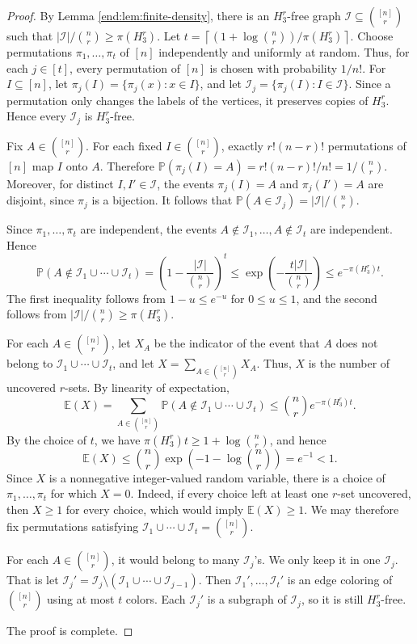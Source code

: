 \documentclass[12pt,a4paper]{article}
\numberwithin{equation}{section}
\theoremstyle{definition}
\theoremstyle{remark}
\begin{document}
\begin{proof}
By Lemma \ref{end:lem:finite-density}, there is an $H_3^r$-free graph  $\mathcal I\subseteq\binom{[n]}r$ such that $|\mathcal I|/\binom nr\ge\pi(H_3^r)$.  Let
$t=\left\lceil(1+\log\binom nr)/\pi(H_3^r)\right\rceil$.
Choose permutations $\pi_1,\ldots,\pi_t$ of $[n]$ independently and uniformly at random.  Thus, for each $j\in[t]$, every permutation of $[n]$ is chosen with probability $1/n!$.  For $I\subseteq[n]$, let $\pi_j(I)=\{\pi_j(x):x\in I\}$, and let $\mathcal I_j=\{\pi_j(I):I\in\mathcal I\}$.  Since a permutation only changes the labels of the vertices, it preserves copies of $H_3^r$.  Hence every $\mathcal I_j$ is $H_3^r$-free.

Fix $A\in\binom{[n]}r$.  For each fixed $I\in\binom{[n]}r$, exactly $r!(n-r)!$ permutations of $[n]$ map $I$ onto $A$. 
Therefore $\mathbb{P}(\pi_j(I)=A)=r!(n-r)!/n!=1/\binom nr$.
Moreover, for distinct $I,I'\in\mathcal I$, the events $\pi_j(I)=A$ and $\pi_j(I')=A$ are disjoint, since $\pi_j$ is a bijection.  
It follows that $\mathbb{P}(A\in\mathcal I_j)=|\mathcal I|/\binom nr$.

Since $\pi_1,\ldots,\pi_t$ are independent, the events $A\notin\mathcal I_1,\ldots,A\notin\mathcal I_t$ are independent.  Hence
$$ \mathbb{P}(A\notin\mathcal I_1\cup\cdots\cup\mathcal I_t)
 =\left(1-\frac{|\mathcal I|}{\binom nr}\right)^t
 \le \exp\left(-\frac{t|\mathcal I|}{\binom nr}\right)
 \le e^{-\pi(H_3^r)t}.$$
The first inequality follows from $1-u\le e^{-u}$ for $0\le u\le1$, and the second follows from $|\mathcal I|/\binom nr\ge\pi(H_3^r)$.

For each $A\in\binom{[n]}r$, let $X_A$ be the indicator of the event that $A$ does not belong to $\mathcal I_1\cup\cdots\cup\mathcal I_t$, and let $X=\sum_{A\in\binom{[n]}r}X_A$.  Thus, $X$ is the number of uncovered $r$-sets.  By linearity of expectation,
$$ \mathbb{E}(X)
 =\sum_{A\in\binom{[n]}r}\mathbb{P}(A\notin\mathcal I_1\cup\cdots\cup\mathcal I_t)
 \le\binom nr e^{-\pi(H_3^r)t}.$$
By the choice of $t$, we have $\pi(H_3^r)t\ge1+\log\binom nr$, and hence
$$ \mathbb{E}(X)\le\binom nr\exp\left(-1-\log\binom nr\right)=e^{-1}<1.$$
Since $X$ is a nonnegative integer-valued random variable, there is a choice of $\pi_1,\ldots,\pi_t$ for which $X=0$.  
Indeed, if every choice left at least one $r$-set uncovered, then $X\ge1$ for every choice, 
which would imply $\mathbb{E}(X)\ge1$.  
We may therefore fix permutations satisfying
$\mathcal I_1\cup\cdots\cup\mathcal I_t=\binom{[n]}r$.

For each $A\in\binom{[n]}r$, it would belong to many $\mathcal I_j$'s. We only keep it in one $\mathcal I_j$. That is let $\mathcal I_j'=\mathcal I_j\setminus (\mathcal I_1\cup \cdots \cup \mathcal I_{j-1}) $. Then  $\mathcal I_1',\ldots,\mathcal I_t'$ is an edge coloring of $\binom{[n]}{r}$ using at most $t$ colors. Each $\mathcal{I}_j'$ is a subgraph of $\mathcal{I}_j$, so it is still $H_3^r$-free. 

The proof is complete.
\end{proof}
\end{document}
